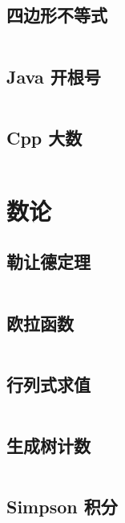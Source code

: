 \documentclass[titlepage,landscape,a4paper,10pt]{article}
\begin{document}
\begin{multicols}{2}
\begin{spacing}{0.8}
\subsection{四边形不等式}
\inputminted{cpp}{Math/四边形不等式.cpp}

\subsection{Java 开根号}
\inputminted{java}{Math/Java开根号.java}

\subsection{Cpp 大数}
\inputminted{cpp}{Math/C++大数.cpp}

\section{数论}

\subsection{勒让德定理}
\inputminted{cpp}{NumberTheory/Legendre.cpp}

\subsection{欧拉函数}
\inputminted{cpp}{NumberTheory/欧拉函数.cpp}

\subsection{行列式求值}
\inputminted{cpp}{Math/Det.cpp}

\subsection{生成树计数}
\inputminted{cpp}{Math/生成树计数.cpp}

\subsection{Simpson 积分}
\inputminted{cpp}{Math/Simpson.cpp}



\end{spacing}
\end{multicols}
\end{document}
